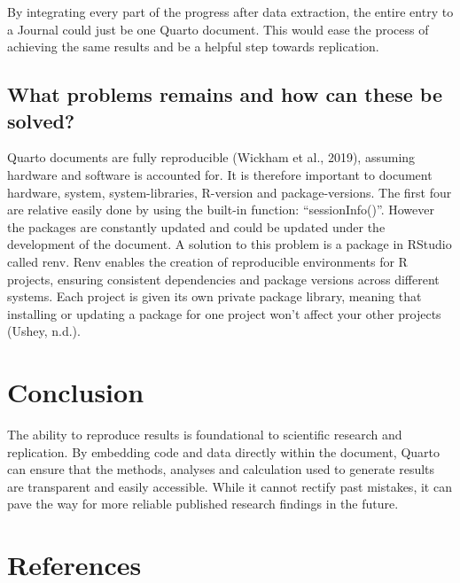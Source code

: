 \documentclass[
  a4paper,
]{article}
\begin{document}
By integrating every part of the progress after data extraction, the
entire entry to a Journal could just be one Quarto document. This would
ease the process of achieving the same results and be a helpful step
towards replication.

\subsection{What problems remains and how can these be
solved?}\label{what-problems-remains-and-how-can-these-be-solved}

Quarto documents are fully reproducible (Wickham et al., 2019), assuming
hardware and software is accounted for. It is therefore important to
document hardware, system, system-libraries, R-version and
package-versions. The first four are relative easily done by using the
built-in function: ``sessionInfo()''. However the packages are
constantly updated and could be updated under the development of the
document. A solution to this problem is a package in RStudio called
renv. Renv enables the creation of reproducible environments for R
projects, ensuring consistent dependencies and package versions across
different systems. Each project is given its own private package
library, meaning that installing or updating a package for one project
won't affect your other projects (Ushey, n.d.).

\section{Conclusion}\label{conclusion}

The ability to reproduce results is foundational to scientific research
and replication. By embedding code and data directly within the
document, Quarto can ensure that the methods, analyses and calculation
used to generate results are transparent and easily accessible. While it
cannot rectify past mistakes, it can pave the way for more reliable
published research findings in the future.

\section*{References}\label{references}
\end{document}
